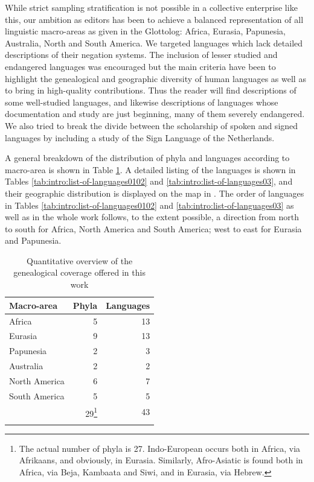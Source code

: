 \documentclass[output=paper,colorlinks,citecolor=brown]{langscibook}
\begin{document}
While strict sampling stratification is not possible in a collective enterprise like this, our ambition as editors has been to achieve a balanced representation of all linguistic macro-areas as given in the Glottolog: Africa, Eurasia, Papunesia, Australia, North and South America. We targeted languages which lack detailed descriptions of their negation systems. The inclusion of lesser studied and endangered languages was encouraged but the main criteria have been to highlight the genealogical and geographic diversity of human languages as well as to bring in high-quality contributions. Thus the reader will find descriptions of some well-studied languages, and likewise descriptions of languages whose documentation and study are just beginning, many of them severely endangered. We also tried to break the divide between the scholarship of spoken and signed languages by including a study of the Sign Language of the Netherlands.

A general breakdown of the distribution of phyla and languages according to macro-area is shown in Table \ref{tab:intro:general}. A detailed listing of the languages is shown in Tables \ref{tab:intro:list-of-languages0102} and \ref{tab:intro:list-of-languages03}, and their geographic distribution is displayed on the map in . The order of languages in Tables \ref{tab:intro:list-of-languages0102} and \ref{tab:intro:list-of-languages03} as well as in the whole work follows, to the extent possible, a direction from north to south for Africa, North America and South America; west to east for Eurasia and Papunesia.

\begin{table} 
    \begin{tabular}{lrr}
        \lsptoprule
        \textbf{Macro-area} & \textbf{Phyla} & \textbf{Languages}\\
        \midrule
        Africa & 5 & 13\\
        Eurasia & 9 & 13\\
        Papunesia & 2 & 3\\
        Australia & 2  & 2\\
        North America & 6  & 7\\
        South America & 5 & 5\\
        \midrule
         & 29\footnote{The actual number of phyla is 27. Indo-European occurs both in Africa, via Afrikaans, and obviously, in Eurasia. Similarly, Afro-Asiatic is found both in Africa, via Beja, Kambaata and Siwi, and in Eurasia, via Hebrew.} & 43\\
        \lspbottomrule
    \end{tabular}
    \caption{Quantitative overview of the genealogical coverage offered in this work}
    \label{tab:intro:general} 
\end{table}
\end{document}
